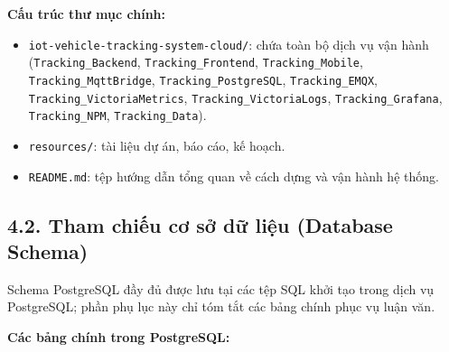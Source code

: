 \documentclass[a4paper]{extarticle}
\providecommand{\tightlist}{%
  \setlength{\itemsep}{0pt}\setlength{\parskip}{0pt}}
\begin{document}
\textbf{Cấu trúc thư mục chính:}

\begin{itemize}
\tightlist
\item
  \texttt{iot-vehicle-tracking-system-cloud/}: chứa toàn bộ dịch vụ vận hành
  (\texttt{Tracking\_Backend}, \texttt{Tracking\_Frontend},
  \texttt{Tracking\_Mobile}, \texttt{Tracking\_MqttBridge},
  \texttt{Tracking\_PostgreSQL}, \texttt{Tracking\_EMQX},
  \texttt{Tracking\_VictoriaMetrics}, \texttt{Tracking\_VictoriaLogs},
  \texttt{Tracking\_Grafana}, \texttt{Tracking\_NPM},
  \texttt{Tracking\_Data}).
\item
  \texttt{resources/}: tài liệu dự án, báo cáo, kế hoạch.
\item
  \texttt{README.md}: tệp hướng dẫn tổng quan về cách dựng và vận hành hệ
  thống.
\end{itemize}

\subsection{4.2. Tham chiếu cơ sở dữ liệu (Database
Schema)}\label{42-tham-chiux1ebfu-cux1a1-sux1edf-dux1eef-liux1ec7u-database-schema}

Schema PostgreSQL đầy đủ được lưu tại các tệp SQL khởi tạo trong dịch vụ
PostgreSQL; phần phụ lục này chỉ tóm tắt các bảng chính phục vụ luận
văn.

\textbf{Các bảng chính trong PostgreSQL:}
\end{document}
